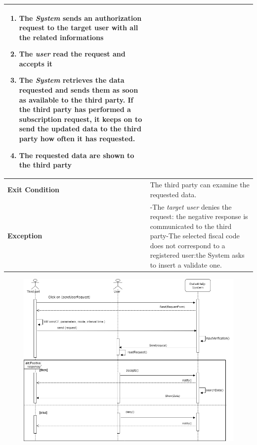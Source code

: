 \begin{table}[H]
\begin{tabular}{|p{3.5cm}|p{10.3cm}|}
\begin{enumerate}[leftmargin=0.5cm]
                            \item The \emph{System} sends an authorization request to the target user with all the related informations
                                            
                                            \item  The  \emph{user} read the request and accepts it
                                            \item The \emph{System} retrieves the data requested and sends them as soon as available to the third party. If the third party has performed a subscription request, it keeps on to send the updated data to the third party how often it has requested.
                                            \item The requested data are shown to the third party
                                
                                          \end{enumerate}
    										\\
    \hline
    \textbf{\large{Exit Condition}} 	& The third party can examine the requested data. \\
    
    \hline
    \textbf{\large{Exception}} 			& -The \emph{target user} denies the request: the negative response is communicated to the third party\newline -The selected fiscal code does not correspond to a registered user:the System asks to insert a validate one.\\
    
    \hline
    
    
    \end{tabular}
	
\end{table}

\begin{figure}[H]
    \centering
    \includegraphics[scale=0.4]{rasdL/Pictures/request1.png}
  
\end{figure}